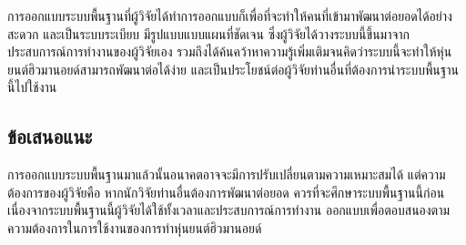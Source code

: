การออกแบบระบบพื้นฐานที่ผู้วิจัยได้ทำการออกแบบก็เพื่อที่จะทำให้คนที่เข้ามาพัฒนาต่อยอดได้อย่างสะดวก
และเป็นระบบระเบียบ มีรูปแบบแบบแผนที่ชัดเจน ซึ่งผู้วิจัยได้วางระบบนี้ขึ้นมาจากประสบการณ์การทำงานของผู้วิจัยเอง
รวมถึงได้ค้นคว้าหาความรู้เพิ่มเติมจนคิดว่าระบบนี้จะทำให้หุ่นยนต์ฮิวมานอยด์สามารถพัฒนาต่อได้ง่าย
และเป็นประโยชน์ต่อผู้วิจัยท่านอื่นที่ต้องการนำระบบพื้นฐานนี้ไปใช้งาน

\subsection*{ข้อเสนอแนะ}
การออกแบบระบบพื้นฐานมาแล้วนั้นอนาคตอาจจะมีการปรับเปลี่ยนตามความเหมาะสมได้ แต่ความต้องการของผู้วิจัยคือ
หากนักวิจัยท่านอื่นต้องการพัฒนาต่อยอด ควรที่จะศึกษาระบบพื้นฐานนี้ก่อน เนื่องจากระบบพื้นฐานนี้ผู้วิจัยได้ใช้ทั้งเวลาและประสบการณ์การทำงาน
ออกแบบเพื่อตอบสนองตามความต้องการในการใช้งานของการทำหุ่นยนต์ฮิวมานอยด์
